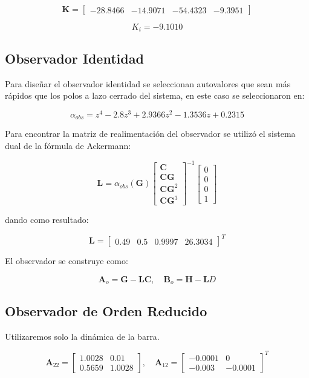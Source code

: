 \[
\mathbf{K} = \begin{bmatrix} -28.8466 & -14.9071 & -54.4323 & -9.3951 \end{bmatrix}
\]

\[
K_i = -9.1010
\]

\subsection{Observador Identidad}

Para diseñar el observador identidad se seleccionan autovalores que sean más rápidos que los polos a lazo cerrado del sistema, en este caso se seleccionaron en:

\[
\alpha_{obs} = z^4 - 2.8 z^3 + 2.9366 z^2 - 1.3536 z + 0.2315
\]

Para encontrar la matriz de realimentación del observador se utilizó el sistema dual de la fórmula de Ackermann:

\[
\mathbf{L} = \alpha_{obs}(\mathbf{G}) \begin{bmatrix} \mathbf{C} \\ \mathbf{C}\mathbf{G} \\ \mathbf{C}\mathbf{G}^2 \\ \mathbf{C}\mathbf{G}^3 \end{bmatrix}^{-1} \begin{bmatrix} 0 \\ 0 \\ 0 \\ 1 \end{bmatrix}
\]

dando como resultado:

\[
\mathbf{L} = \begin{bmatrix} 0.49 & 0.5 & 0.9997 & 26.3034 \end{bmatrix}^T
\]

El observador se construye como:

\[
\mathbf{A}_o = \mathbf{G} - \mathbf{L}\mathbf{C}, \quad \mathbf{B}_o = \mathbf{H} - \mathbf{L} D
\]

\subsection{Observador de Orden Reducido}

Utilizaremos solo la dinámica de la barra.

\[
\mathbf{A}_{22} = \begin{bmatrix} 1.0028 & 0.01 \\ 0.5659 & 1.0028 \end{bmatrix}, \quad \mathbf{A}_{12} = \begin{bmatrix} -0.0001 & 0 \\ -0.003 & -0.0001 \end{bmatrix}^T
\]

